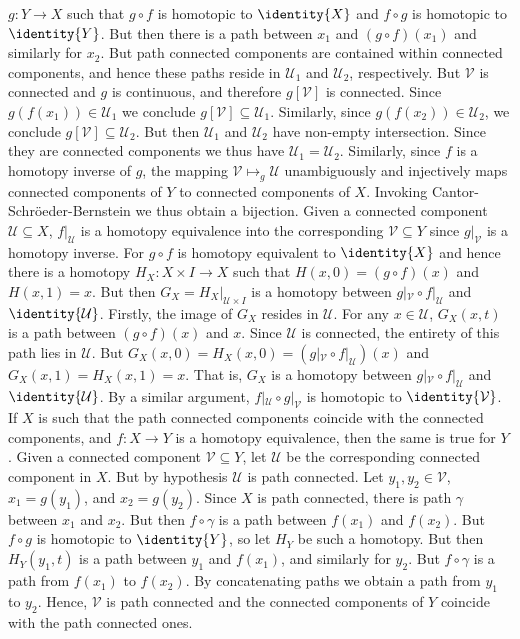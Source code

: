 \documentclass{book}                                                           %
\begin{document}
\begin{solution}
    $g:Y\rightarrow{X}$ such that $g\circ{f}$ is homotopic to $\identity{X}$
    and $f\circ{g}$ is homotopic to $\identity{Y}$. But then there is a path
    between $x_{1}$ and $(g\circ{f})(x_{1})$ and similarly for $x_{2}$. But
    path connected components are contained within connected components, and
    hence these paths reside in $\mathcal{U}_{1}$ and $\mathcal{U}_{2}$,
    respectively. But $\mathcal{V}$ is connected and $g$ is continuous, and
    therefore $g[\mathcal{V}]$ is connected. Since
    $g(f(x_{1}))\in\mathcal{U}_{1}$ we conclude
    $g[\mathcal{V}]\subseteq\mathcal{U}_{1}$. Similarly, since
    $g(f(x_{2}))\in\mathcal{U}_{2}$, we conclude
    $g[\mathcal{V}]\subseteq\mathcal{U}_{2}$. But then $\mathcal{U}_{1}$ and
    $\mathcal{U}_{2}$ have non-empty intersection. Since they are connected
    components we thus have $\mathcal{U}_{1}=\mathcal{U}_{2}$. Similarly,
    since $f$ is a homotopy inverse of $g$, the mapping
    $\mathcal{V}\mapsto_{g}\mathcal{U}$ unambiguously and injectively maps 
    connected components of $Y$ to connected components of $X$. Invoking
    Cantor-Schr\"{o}eder-Bernstein we thus obtain a bijection. Given
    a connected component $\mathcal{U}\subseteq{X}$, $f|_{\mathcal{U}}$ is a
    homotopy equivalence into the corresponding $\mathcal{V}\subseteq{Y}$
    since $g|_{\mathcal{V}}$ is a homotopy inverse. For $g\circ{f}$ is
    homotopy equivalent to $\identity{X}$ and hence there is a homotopy
    $H_{X}:X\times{I}\rightarrow{X}$ such that
    $H(x,0)=(g\circ{f})(x)$ and $H(x,1)=x$. But then
    $G_{X}=H_{X}|_{\mathcal{U}\times{I}}$ is a homotopy between
    $g|_{\mathcal{V}}\circ{f}|_{\mathcal{U}}$ and $\identity{\mathcal{U}}$.
    Firstly, the image of $G_{X}$ resides in $\mathcal{U}$. For any
    $x\in\mathcal{U}$, $G_{X}(x,t)$ is a path between
    $(g\circ{f})(x)$ and $x$. Since $\mathcal{U}$ is connected, the entirety
    of this path lies in $\mathcal{U}$. But
    $G_{X}(x,0)=H_{X}(x,0)=(g|_{\mathcal{V}}\circ{f}|_{\mathcal{U}})(x)$
    and $G_{X}(x,1)=H_{X}(x,1)=x$. That is, $G_{X}$ is a homotopy between
    $g|_{\mathcal{V}}\circ{f}|_{\mathcal{U}}$ and $\identity{\mathcal{U}}$.
    By a similar argument, $f|_{\mathcal{U}}\circ{g}|_{\mathcal{V}}$ is
    homotopic to $\identity{\mathcal{V}}$. If $X$ is such that the path
    connected components coincide with the connected components, and
    $f:X\rightarrow{Y}$ is a homotopy equivalence, then the same is true for
    $Y$. Given a connected component $\mathcal{V}\subseteq{Y}$, let
    $\mathcal{U}$ be the corresponding connected component in $X$. But by
    hypothesis $\mathcal{U}$ is path connected. Let
    $y_{1},y_{2}\in\mathcal{V}$, $x_{1}=g(y_{1})$, and $x_{2}=g(y_{2})$.
    Since $X$ is path connected, there is path $\gamma$ between $x_{1}$ and
    $x_{2}$. But then $f\circ\gamma$ is a path between $f(x_{1})$ and
    $f(x_{2})$. But $f\circ{g}$ is homotopic to $\identity{Y}$, so let
    $H_{Y}$ be such a homotopy. But then $H_{Y}(y_{1},t)$ is a path between
    $y_{1}$ and $f(x_{1})$, and similarly for $y_{2}$. But $f\circ\gamma$
    is a path from $f(x_{1})$ to $f(x_{2})$. By concatenating paths we
    obtain a path from $y_{1}$ to $y_{2}$. Hence, $\mathcal{V}$ is path
    connected and the connected components of $Y$ coincide with the path
    connected ones.
\end{solution}
\end{document}
